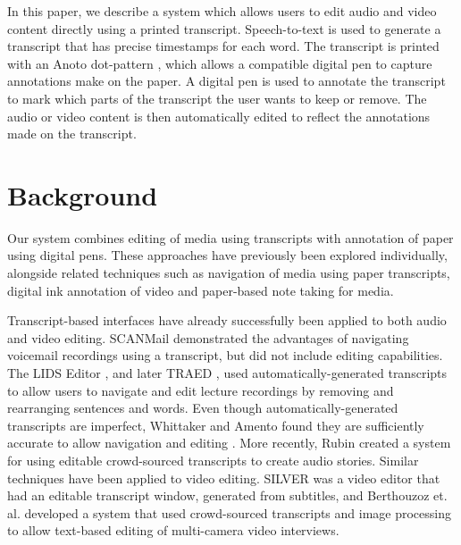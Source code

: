 In this paper, we describe a system which allows users to edit audio and video content directly using a printed
transcript.  Speech-to-text is used to generate a transcript that has precise timestamps for each word.  The transcript
is printed with an Anoto dot-pattern \citep{Fahraeus2003}, which allows a compatible digital pen to capture annotations
make on the paper.  A digital pen is used to annotate the transcript to mark which parts of the transcript the user
wants to keep or remove.  The audio or video content is then automatically edited to reflect the annotations made on
the transcript.




\section{Background}\label{sec:paper-background}
Our system combines editing of media using transcripts with annotation of paper using digital pens. These approaches
have previously been explored individually, alongside related techniques such as navigation of media using paper
transcripts, digital ink annotation of video and paper-based note taking for media.

Transcript-based interfaces have already successfully been applied to both audio and video editing. SCANMail
\citep{Whittaker2002} demonstrated the advantages of navigating voicemail recordings using a transcript, but did not
include editing capabilities.  The LIDS Editor \citep{Apperley2002}, and later TRAED \citep{Masoodian2006}, used
automatically-generated transcripts to allow users to navigate and edit lecture recordings by removing and rearranging
sentences and words. Even though automatically-generated transcripts are imperfect, Whittaker and Amento found they are
sufficiently accurate to allow navigation and editing \citep{Whittaker2004}.  More recently, Rubin \citep{Rubin2013}
created a system for using editable crowd-sourced transcripts to create audio stories.  Similar techniques have been
applied to video editing. SILVER \citep{Casares2002} was a video editor that had an editable transcript window,
generated from subtitles, and Berthouzoz et. al.  \citep{Berthouzoz2012} developed a system that used crowd-sourced
transcripts and image processing to allow text-based editing of multi-camera video interviews.

